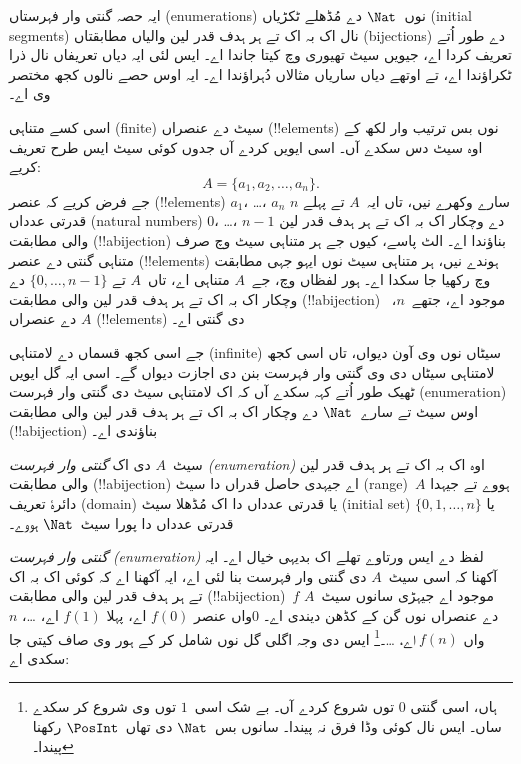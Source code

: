 \documentclass[../../../include/open-logic-section]{subfiles}
\begin{document}


\begin{editorial}
  ایہ حصہ گنتی وار فہرستاں (enumerations) نوں~$\Nat$ دے مُڈھلے
  ٹکڑیاں (initial segments) نال اک بہ اک تے ہر ہدف قدر لین والیاں
  مطابقتاں (bijections) دے طور اُتے تعریف کردا اے، جیویں سیٹ تھیوری
  وچ کیتا جاندا اے۔ ایس لئی ایہ  دیاں تعریفاں نال ذرا
  ٹکراؤندا اے، تے اوتھے دیاں ساریاں مثالاں دُہراؤندا اے۔ ایہ اوس
  حصے نالوں کجھ مختصر وی اے۔
\end{editorial}

اسی کسے متناہی (finite) سیٹ دے عنصراں (!!{element}s) نوں بس ترتیب
وار لکھ کے اوہ سیٹ دس سکدے آں۔ اسی ایویں کردے آں جدوں کوئی سیٹ ایس
طرح تعریف کریے:
\[
  A = \{a_1, a_2, \ldots, a_n\}.
\]
جے فرض کریے کہ عنصر (!!{element}s) $a_1$، \dots، $a_n$ سارے وکھرے
نیں، تاں ایہ~$A$ تے پہلے $n$ قدرتی عدداں (natural numbers) $0$،
\dots، $n-1$ دے وچکار اک بہ اک تے ہر ہدف قدر لین والی مطابقت
(!!a{bijection}) بناؤندا اے۔ الٹ پاسے، کیوں جے ہر متناہی سیٹ وچ
صرف متناہی گنتی دے عنصر (!!{element}s) ہوندے نیں، ہر متناہی سیٹ نوں
ایہو جہی مطابقت وچ رکھیا جا سکدا اے۔ ہور لفظاں وچ، جے~$A$ متناہی
اے، تاں~$A$ تے $\{0, \dots, n-1\}$ دے وچکار اک بہ اک تے ہر ہدف
قدر لین والی مطابقت (!!a{bijection}) موجود اے، جتھے~$n$،~$A$ دے
عنصراں (!!{element}s) دی گنتی اے۔

جے اسی کجھ قسماں دے لامتناہی (infinite) سیٹاں نوں وی آون دیواں، تاں
اسی کجھ لامتناہی سیٹاں دی وی گنتی وار فہرست بنن دی اجازت دیواں گے۔
اسی ایہ گل ایویں ٹھیک طور اُتے کہہ سکدے آں کہ اک لامتناہی سیٹ دی
گنتی وار فہرست (enumeration) اوس سیٹ تے سارے~$\Nat$ دے وچکار اک بہ
اک تے ہر ہدف قدر لین والی مطابقت (!!a{bijection}) بناؤندی اے۔

\begin{defn}
سیٹ~$A$ دی اک \emph{گنتی وار فہرست (enumeration)} اوہ اک بہ اک تے ہر
ہدف قدر لین والی مطابقت (!!a{bijection}) اے جیہدی حاصل قدراں دا سیٹ
(range)~$A$ ہووے تے جیہدا دائرۂ تعریف (domain) یا قدرتی عدداں دا اک
مُڈھلا سیٹ (initial set) $\{0, 1, \ldots, n\}$ {یا} قدرتی عدداں دا
پورا سیٹ~$\Nat$ ہووے۔
\end{defn}

\begin{explain}
\emph{گنتی وار فہرست (enumeration)} لفظ دے ایس ورتاوے تھلے اک بدیہی خیال اے۔ ایہ
آکھنا کہ اسی سیٹ~$A$ دی گنتی وار فہرست بنا لئی اے، ایہ آکھنا اے کہ
کوئی اک بہ اک تے ہر ہدف قدر لین والی مطابقت (!!a{bijection})~$f$
موجود اے جیہڑی سانوں سیٹ~$A$ دے عنصراں نوں گن کے کڈھن دیندی اے۔
$0$واں عنصر $f(0)$ اے، پہلا $f(1)$ اے،
\ldots{}، $n$واں $f(n)$ اے، \ldots۔\footnote{ہاں، اسی گنتی
$0$ توں شروع کردے آں۔ بے شک اسی~$1$ توں وی شروع کر سکدے ساں۔ ایس
نال کوئی وڈا فرق نہ پیندا۔ سانوں بس~$\Nat$ دی تھاں~$\PosInt$ رکھنا
پیندا۔} ایس دی وجہ اگلی گل نوں شامل کر کے ہور وی صاف کیتی جا سکدی اے:
\end{explain}
\end{document}
